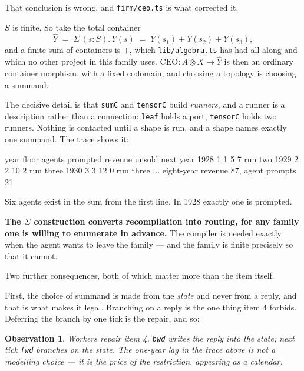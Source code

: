 \documentclass[11pt,a4paper]{article}
\newtheorem*{obs}{Observation}
\begin{document}
\begin{notebox}
That conclusion is wrong, and \texttt{firm/ceo.ts} is what corrected it.

$S$ is finite. So take the total container
\[
  \hat{Y} \;=\; \Sigma\,(s : S).\, Y(s) \;=\; Y(s_1) + Y(s_2) + Y(s_3),
\]
and a finite sum of containers is $+$, which \texttt{lib/algebra.ts} has had
all along and which no other project in this family uses. $\mathrm{CEO} :
A \otimes X \to \hat{Y}$ is then an ordinary container morphism, with a fixed
codomain, and choosing a topology is choosing a summand.
\end{notebox}

The decisive detail is that \texttt{sumC} and \texttt{tensorC} build
\emph{runners}, and a runner is a description rather than a connection:
\texttt{leaf} holds a port, \texttt{tensorC} holds two runners. Nothing is
contacted until a shape is run, and a shape names exactly one summand. The
trace shows it:

\begin{term}
  year  floor  agents prompted  revenue  unsold   next year
  1928     1              1         5       7      run two
  1929     2              2        10       2      run three
  1930     3              3        12       0      run three
  ...
  eight-year revenue 87, agent prompts 21
\end{term}

Six agents exist in the sum from the first line. In 1928 exactly one is
prompted.

\begin{sectionbox}
\textbf{The $\Sigma$ construction converts recompilation into routing, for any
family one is willing to enumerate in advance.} The compiler is needed exactly
when the agent wants to leave the family --- and the family is finite precisely
so that it cannot.
\end{sectionbox}

Two further consequences, both of which matter more than the item itself.

First, the choice of summand is made from the \emph{state} and never from a
reply, and that is what makes it legal. Branching on a reply is the one thing
item 4 forbids. Deferring the branch by one tick is the repair, and so:

\begin{obs}
Workers repair item 4. \texttt{bwd} writes the reply into the state; next tick
\texttt{fwd} branches on the state. The one-year lag in the trace above is not
a modelling choice --- it is the price of the restriction, appearing as a
calendar.
\end{obs}
\end{document}
